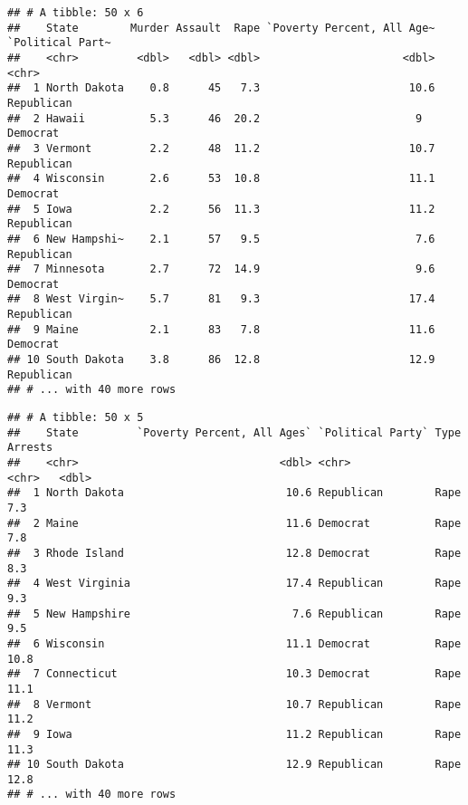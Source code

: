 \documentclass[]{article}
\newenvironment{Shaded}{\begin{snugshade}}{\end{snugshade}}
\newcommand{\KeywordTok}[1]{\textcolor[rgb]{0.13,0.29,0.53}{\textbf{#1}}}
\newcommand{\NormalTok}[1]{#1}
\newcommand{\OperatorTok}[1]{\textcolor[rgb]{0.81,0.36,0.00}{\textbf{#1}}}
\newcommand{\StringTok}[1]{\textcolor[rgb]{0.31,0.60,0.02}{#1}}
\begin{document}
\begin{Shaded}
\end{Shaded}

\begin{verbatim}
## # A tibble: 50 x 6
##    State        Murder Assault  Rape `Poverty Percent, All Age~ `Political Part~
##    <chr>         <dbl>   <dbl> <dbl>                      <dbl> <chr>           
##  1 North Dakota    0.8      45   7.3                       10.6 Republican      
##  2 Hawaii          5.3      46  20.2                        9   Democrat        
##  3 Vermont         2.2      48  11.2                       10.7 Republican      
##  4 Wisconsin       2.6      53  10.8                       11.1 Democrat        
##  5 Iowa            2.2      56  11.3                       11.2 Republican      
##  6 New Hampshi~    2.1      57   9.5                        7.6 Republican      
##  7 Minnesota       2.7      72  14.9                        9.6 Democrat        
##  8 West Virgin~    5.7      81   9.3                       17.4 Republican      
##  9 Maine           2.1      83   7.8                       11.6 Democrat        
## 10 South Dakota    3.8      86  12.8                       12.9 Republican      
## # ... with 40 more rows
\end{verbatim}

\begin{Shaded}
\end{Shaded}

\begin{verbatim}
## # A tibble: 50 x 5
##    State         `Poverty Percent, All Ages` `Political Party` Type  Arrests
##    <chr>                               <dbl> <chr>             <chr>   <dbl>
##  1 North Dakota                         10.6 Republican        Rape      7.3
##  2 Maine                                11.6 Democrat          Rape      7.8
##  3 Rhode Island                         12.8 Democrat          Rape      8.3
##  4 West Virginia                        17.4 Republican        Rape      9.3
##  5 New Hampshire                         7.6 Republican        Rape      9.5
##  6 Wisconsin                            11.1 Democrat          Rape     10.8
##  7 Connecticut                          10.3 Democrat          Rape     11.1
##  8 Vermont                              10.7 Republican        Rape     11.2
##  9 Iowa                                 11.2 Republican        Rape     11.3
## 10 South Dakota                         12.9 Republican        Rape     12.8
## # ... with 40 more rows
\end{verbatim}
\end{document}

